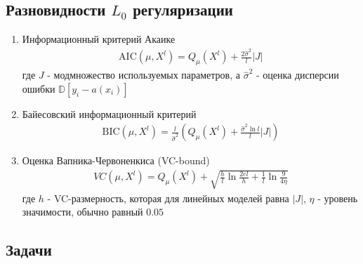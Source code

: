 \subsection*{Разновидности $L_0$ регуляризации}

\begin{enumerate}
    \item Информационный критерий Акаике 
        \begin{align*}
            \text{AIC}(\mu, X^l) = Q_{\mu}(X^l) + \frac{2\hat{\sigma}^2}{l}|J|
        \end{align*}
        где $J$ - модмножество используемых параметров, а $\hat{\sigma}^2$ - оценка дисперсии ошибки $\mathbb{D}[y_i - a(x_i)]$ 
    \item Байесовский информационный критерий
        \begin{align*}
            \text{BIC}(\mu, X^l) = \frac{l}{\hat{\sigma}^2}\left(Q_{\mu}(X^l) + \frac{\hat{\sigma}^2\ln{l}}{l}|J|\right)
        \end{align*}
    \item Оценка Вапника-Червоненкиса (VC-bound)
        \begin{align*}
            VC(\mu, X^l) = Q_{\mu}(X^l) + \sqrt{\frac{h}{l}\ln{\frac{2el}{h}} + \frac{1}{l}\ln{\frac{9}{4\eta}}}
        \end{align*}
        где $h$ - VC-размерность, которая для линейных моделей равна $|J|$, $\eta$ - уровень значимости, обычно равный $0.05$
\end{enumerate}

\subsection*{Задачи}


